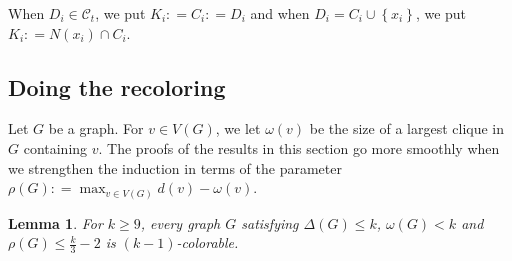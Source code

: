 \documentclass[12pt]{article}
\theoremstyle{plain}
\newtheorem{lem}[thm]{Lemma}
\theoremstyle{definition}
\theoremstyle{remark}
\newcommand{\fancy}[1]{\mathcal{#1}}
\newcommand{\CC}{\fancy{C}}
\newcommand{\set}[1]{\left\{ #1 \right\}}
\newcommand{\DefinedAs}{\mathrel{\mathop:}=}
\begin{document}
\noindent When $D_i \in \CC_t$, we put $K_i \DefinedAs C_i \DefinedAs D_i$ and
when $D_i = C_i \cup \set{x_i}$, we put $K_i \DefinedAs N(x_i) \cap C_i$.

\subsection{Doing the recoloring}

Let $G$ be a graph.  For $v \in V(G)$, we let $\omega(v)$ be the size of a
largest clique in $G$ containing $v$.  The proofs of the results in this section
go more smoothly when we strengthen the induction in terms of the parameter
$\rho(G) \DefinedAs \max_{v \in V(G)} d(v) - \omega(v)$.

\begin{lem}\label{MainBKLemma}
For $k \geq 9$, every graph $G$ satisfying $\Delta(G) \leq k$, $\omega(G) < k$ and $\rho(G)
\leq \frac{k}{3} - 2$ is $(k-1)$-colorable.
\end{lem}
\end{document}
